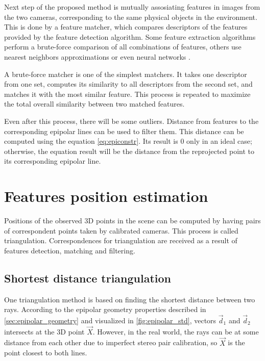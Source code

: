 Next step of the proposed method is mutually assosiating features in images from the two cameras, corresponding to the same physical objects in the environment. 
This is done by a feature matcher, which compares descriptors of the features provided by the feature detection algorithm.
Some feature extraction algorithms perform a brute-force comparison of all combinations of features, others use nearest neighbors approximations or even neural networks \cite{Sarlin2020}.

A brute-force matcher is one of the simplest matchers.
It takes one descriptor from one set, computes its similarity to all descriptors from the second set, and matches it with the most similar feature. 
This process is repeated to maximize the total overall similarity between two matched features.

Even after this process, there will be some outliers.
Distance from features to the corresponding epipolar lines can be used to filter them. 
This distance can be computed using the equation \autoref{eq:epiconstr}.
Its result is $0$ only in an ideal case; otherwise, the equation result will be the distance from the reprojected point to its corresponding epipolar line.

\section{Features position estimation}
Positions of the observed 3D points in the scene can be computed by having pairs of correspondent points taken by calibrated cameras.
This process is called triangulation.
Correspondences for triangulation are received as a result of features detection, matching and filtering.

\subsection{Shortest distance triangulation}
\label{sec:shortest_distance}
One triangulation method is based on finding the shortest distance between two rays.
According to the epipolar geometry properties described in \autoref{sec:epipolar_geometry} and visualized in \autoref{fig:epipolar_std}, vectors $\vec{d}_1$ and $\vec{d}_2$ intersects at the 3D point $\vec{X}$.
However, in the real world, the rays can be at some distance from each other due to imperfect stereo pair calibration, so $\vec{X}$ is the point closest to both lines.

